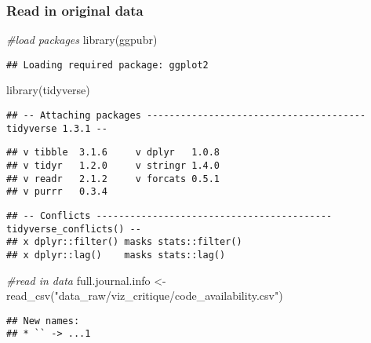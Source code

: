 \documentclass[
]{article}
\newenvironment{Shaded}{\begin{snugshade}}{\end{snugshade}}
\newcommand{\CommentTok}[1]{\textcolor[rgb]{0.56,0.35,0.01}{\textit{#1}}}
\newcommand{\FunctionTok}[1]{\textcolor[rgb]{0.00,0.00,0.00}{#1}}
\newcommand{\NormalTok}[1]{#1}
\newcommand{\OtherTok}[1]{\textcolor[rgb]{0.56,0.35,0.01}{#1}}
\newcommand{\StringTok}[1]{\textcolor[rgb]{0.31,0.60,0.02}{#1}}
\begin{document}
\hypertarget{read-in-original-data}{%
\subsubsection{Read in original data}\label{read-in-original-data}}

\begin{Shaded}
\begin{Highlighting}[]
\CommentTok{\#load packages}
\FunctionTok{library}\NormalTok{(ggpubr)}
\end{Highlighting}
\end{Shaded}

\begin{verbatim}
## Loading required package: ggplot2
\end{verbatim}

\begin{Shaded}
\begin{Highlighting}[]
\FunctionTok{library}\NormalTok{(tidyverse)}
\end{Highlighting}
\end{Shaded}

\begin{verbatim}
## -- Attaching packages --------------------------------------- tidyverse 1.3.1 --
\end{verbatim}

\begin{verbatim}
## v tibble  3.1.6     v dplyr   1.0.8
## v tidyr   1.2.0     v stringr 1.4.0
## v readr   2.1.2     v forcats 0.5.1
## v purrr   0.3.4
\end{verbatim}

\begin{verbatim}
## -- Conflicts ------------------------------------------ tidyverse_conflicts() --
## x dplyr::filter() masks stats::filter()
## x dplyr::lag()    masks stats::lag()
\end{verbatim}

\begin{Shaded}
\begin{Highlighting}[]
\CommentTok{\#read in data}
\NormalTok{full.journal.info }\OtherTok{\textless{}{-}} \FunctionTok{read\_csv}\NormalTok{(}\StringTok{"data\_raw/viz\_critique/code\_availability.csv"}\NormalTok{)}
\end{Highlighting}
\end{Shaded}

\begin{verbatim}
## New names:
## * `` -> ...1
\end{verbatim}
\end{document}
